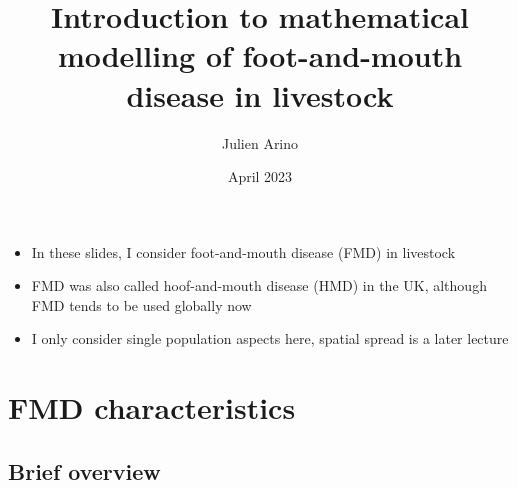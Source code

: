 \documentclass[aspectratio=43]{beamer}
\title{Introduction to mathematical modelling of foot-and-mouth disease in livestock}
\author{Julien Arino}
\date{April 2023}
\begin{document}

\begin{frame}
  \titlepage
\end{frame}
\addtocounter{page}{-1}


\begin{frame}
\begin{itemize}
  \item In these slides, I consider foot-and-mouth disease (FMD) in livestock
  \vfill
  \item FMD was also called hoof-and-mouth disease (HMD) in the UK, although FMD tends to be used globally now
  \vfill
  \item I only consider single population aspects here, spatial spread is a later lecture
\end{itemize}
\end{frame}


\section{FMD characteristics}

\subsection{Brief overview}
\end{document}
